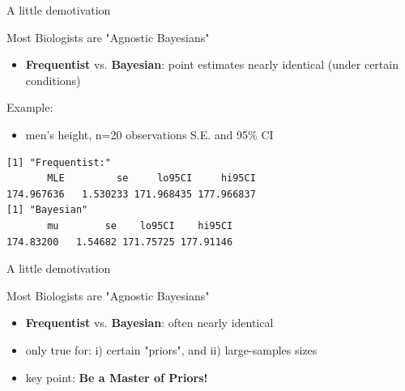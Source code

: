 \documentclass[presentation]{beamer}
\begin{document}
\begin{frame}[fragile,label=sec-15]{A little demotivation}
 \begin{block}{Most Biologists are "Agnostic Bayesians"}
\begin{itemize}
\item \textbf{Frequentist} vs. \textbf{Bayesian}: point estimates nearly identical (under certain conditions)
\end{itemize}
\color{red}
\begin{block}{Example:}
\begin{itemize}
\item men's height, n=20 observations
S.E. and 95\% CI
\end{itemize}
\color{blue}
\begin{verbatim}
[1] "Frequentist:"
       MLE         se     lo95CI     hi95CI 
174.967636   1.530233 171.968435 177.966837
[1] "Bayesian"
       mu        se    lo95CI    hi95CI 
174.83200   1.54682 171.75725 177.91146
\end{verbatim}

\color{black}
\end{block}
\end{block}
\end{frame}

\begin{frame}[label=sec-16]{A little demotivation}
\begin{block}{Most Biologists are "Agnostic Bayesians"}
\begin{itemize}
\item \textbf{Frequentist} vs. \textbf{Bayesian}: often nearly identical
\item only true for: i) certain "priors", and ii) large-samples sizes
\item key point: \textbf{Be a Master of Priors!}
\end{itemize}
\end{block}
\end{frame}
\end{document}

